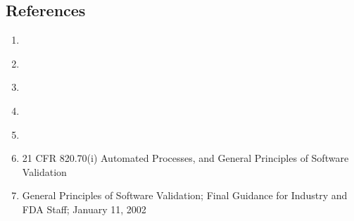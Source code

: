 \subsection{References}
\begin{enumerate}
  \item \sopSDLC\
  \item \sopSCM\
  \item \sopGDP\
  \item \sopPAP\
  \item \sopISS\

  \item 21 CFR 820.70(i) Automated Processes, and General Principles of Software
    Validation

  \item General Principles of Software Validation; Final Guidance for Industry
    and FDA Staff; January 11, 2002
\end{enumerate}
